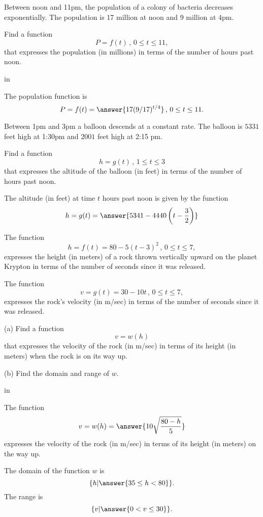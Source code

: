 \documentclass{ximera}
\newcommand{\pskip}{\vskip 0.1 in}
\begin{document}
\begin{question}  \label{Q87d6fgte}
Between noon and 11pm, the population of a colony of bacteria decreases exponentially. The population is 17 million at noon and 9 million at 4pm.

Find a function
\[
        P = f(t) \, , \, 0\leq t \leq 11 ,
\]
that expresses the population (in millions) in terms of the number of hours past noon.

\pskip

The population function is
\[
    P = f(t) = \answer{17(9/17)^{t/4}} \, , \, 0\leq t \leq 11 .
\]
\end{question}


\begin{question}  \label{Q98d33dg5r5r3}
Between 1pm and 3pm a balloon descends at a constant rate. The balloon is $5331$ feet high at 1:30pm and $2001$ feet high at 2:15 pm.

Find a function
\[
      h = g(t) \, , \, 1\leq t \leq 3
\]
that expresses the altitude of the balloon (in feet) in terms of the number of hours past noon.


The altitude (in feet) at time $t$ hours past noon is given by the function
\[
  h = g(t) = \answer{5341 - 4440  \left(t - \frac{3}{2}   \right)}
\]
\end{question}

\begin{question}  \label{Q9331435rfe}
The function
\[
   h = f(t) = 80 - 5(t-3)^2 \, , \, 0\leq t \leq 7 , 
\]
expresses the height (in meters) of a rock thrown vertically upward on the planet Krypton in terms of the number of seconds since it was released.

The function
\[
   v = g(t) = 30 - 10t \, , \, 0\leq t \leq 7 ,
\]
expresses the rock's velocity (in m/sec) in terms of the number of seconds since it was released.

(a) Find a function 
\[
       v = w(h)
\]
that expresses the velocity of the rock (in m/sec) in terms of its height (in meters) when the rock is on its way up.

(b) Find the domain and range of $w$.

\pskip

The function
\[
       v = w(h)  = \answer{10\sqrt{\frac{80-h}{5}}}
\]
expresses the velocity of the rock (in m/sec) in terms of its height (in meters) on the way up.

The domain of the function $w$ is
\[
            \{ h | \answer{35 \leq h < 80} \}.
\] 
The range is
\[
   \{ v | \answer{0 < v \leq 30} \}.
\]


\end{question}
\end{document}
